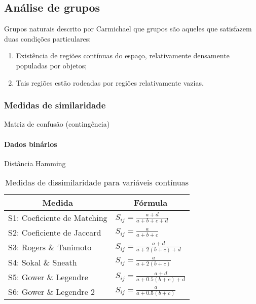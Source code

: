 \subsection{Análise de grupos}

Grupos naturais descrito por Carmichael que grupos são aqueles que satisfazem duas condições particulares:
\begin{enumerate}
    \item Existência de regiões contínuas do espaço, relativamente densamente populadas por objetos;
    \item Tais regiões estão rodeadas por regiões relativamente vazias.
\end{enumerate}


\subsubsection{Medidas de similaridade}

Matriz de confusão (contingência)

\paragraph*{Dados binários}

Distância Hamming

\begin{table}
    \centering
    \caption{Medidas de dissimilaridade para variáveis contínuas}
    \begin{tabular}{l|l}
        \hline
        \multicolumn{1}{c|}{\textbf{Medida}} & \multicolumn{1}{c}{\textbf{Fórmula}}       \\ \hline
        S1: Coeficiente de Matching          & $ S_{ij} = \frac{a + d}{a + b + c + d}   $ \\ \hline
        S2: Coeficiente de Jaccard           & $ S_{ij} = \frac{a}{a+b+c}               $ \\ \hline
        S3: Rogers \& Tanimoto               & $ S_{ij} = \frac{a+d}{a+2(b+c)+d}        $ \\ \hline
        S4: Sokal \& Sneath                  & $ S_{ij} = \frac{a}{a+2(b+c)}            $ \\ \hline
        S5: Gower \& Legendre                & $ S_{ij} = \frac{a+d}{a+0.5(b+c)+d}      $ \\ \hline
        S6: Gower \& Legendre 2              & $ S_{ij} = \frac{a}{a+0.5(b+c)}          $ \\ \hline
    \end{tabular}
\end{table}


